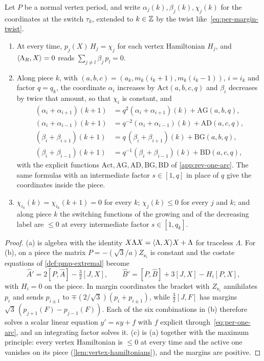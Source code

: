 \begin{lemma}\label{lem:costate-transport}
Let $P$ be a normal vertex period, and write $\alpha_j(k),\beta_j(k),\chi_j(k)$ for the
coordinates at the switch $\tau_k$, extended to $k\in\mathbb{Z}$ by the twist like~\eqref{eq:per-margin-twist}.
\begin{enumerate}[label=\textup{(\alph*)}]
\item At every time, $p_j(X)\,H_j=\chi_j$ for each vertex Hamiltonian $H_j$, and
  $\langle \Lambda_R,X\rangle=0$ reads $\sum_{j\ne l}\beta_j\,p_l=0$.
\item Along piece $k$, with $(a,b,c)=(a_k,m_k(i_k+1),m_k(i_k-1))$, $i=i_k$ and factor $q=q_k$,
  the coordinate $\alpha_i$ increases by $\mathrm{Act}(a,b,c,q)$ and $\beta_i$ decreases by twice
  that amount, so that $\chi_i$ is constant, and
  \[
    \begin{aligned}
    (\alpha_i+\alpha_{i+1})(k+1)&=q^2(\alpha_i+\alpha_{i+1})(k)+\mathrm{AG}(a,b,q),\\
    (\alpha_i+\alpha_{i-1})(k+1)&=q^{-2}(\alpha_i+\alpha_{i-1})(k)+\mathrm{AD}(a,c,q),\\
    (\beta_i+\beta_{i+1})(k+1)&=q\,(\beta_i+\beta_{i+1})(k)+\mathrm{BG}(a,b,q),\\
    (\beta_i+\beta_{i-1})(k+1)&=q^{-1}(\beta_i+\beta_{i-1})(k)+\mathrm{BD}(a,c,q),
    \end{aligned}
  \]
  with the explicit functions $\mathrm{Act},\mathrm{AG},\mathrm{AD},\mathrm{BG},\mathrm{BD}$ of
  \cref{app:rev-one-arc}. The same formulas with an intermediate factor $s\in[1,q]$ in place of
  $q$ give the coordinates inside the piece.
\item $\chi_{i_k}(k)=\chi_{i_k}(k+1)=0$ for every $k$; $\chi_j(k)\le0$ for every $j$ and $k$;
  and along piece $k$ the switching functions of the growing and of the decreasing label are
  $\le0$ at every intermediate factor $s\in[1,q_k]$.
\end{enumerate}
\end{lemma}

\begin{proof}
(a) is algebra with the identity $X\Lambda X=\langle \Lambda,X\rangle X+\Lambda$ for traceless $\Lambda$. For (b), on a piece the matrix $P=-(\sqrt3/a)Z_{\ee_i}$ is constant
and the costate equations of \cref{def:pmp-extremal} become
\[
  \hat A'=2[P,\hat A]-\tfrac32[J,X],\qquad \hat B'=[P,\hat B]+3[J,X]-H_i[P,X],
\]
with $H_i=0$ on the piece. In margin coordinates the bracket with $Z_{\ee_i}$
annihilates $p_i$ and sends $p_{i\pm1}$ to $\mp(2/\sqrt3)(p_i+p_{i\pm1})$, while $\frac32[J,F]$
has margins $\sqrt3\,(p_{j+1}(F)-p_{j-1}(F))$. Each of the six combinations in (b) therefore solves a scalar
linear equation $y'=\kappa y+f$ with $f$ explicit through~\eqref{eq:per-one-arc}, and an integrating
factor solves it. (c) is (a) together with the maximum principle: every vertex
Hamiltonian is $\le0$ at every time and the active one vanishes on its piece
(\cref{lem:vertex-hamiltonians}), and the margins are positive.
\end{proof}

